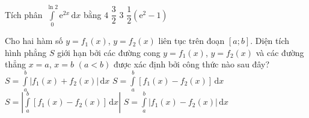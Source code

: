 \begin{ex}%
	Tích phân $\displaystyle \int \limits_0^{\ln 2} \mathrm{e}^{2x} \mathrm{\,d}x$ bằng
	\choice
	{$4$}
	{\True $\dfrac{3}{2}$}
	{$3$}
	{$\dfrac{1}{2}(\mathrm{e}^2 -1)$}
\end{ex}

\begin{ex}%
	Cho hai hàm số $y=f_1 (x)$, $y=f_2 (x)$ liên tục trên đoạn $[a;b]$. Diện tích hình phẳng $S$ giới hạn bởi các đường cong $y=f_1 (x)$, $y=f_2 (x)$ và các đường thẳng $x=a$, $x=b$ $(a<b)$ được xác định bởi công thức nào sau đây?
	\choice
	{$S=\displaystyle \int \limits_a^b \left| f_1 (x) +f_2 (x) \right| \mathrm{\,d}x$}
	{$S=\displaystyle \int \limits_a^b \left[ f_1 (x) -f_2 (x) \right] \mathrm{\,d}x$}
	{$S=\left| \displaystyle \int \limits_a^b \left[ f_1 (x) -f_2 (x) \right] \mathrm{\,d}x \right|$}
	{\True $S=\displaystyle \int \limits_a^b \left| f_1 (x) -f_2 (x) \right| \mathrm{\,d}x$}
\end{ex}

